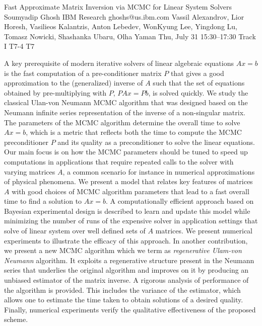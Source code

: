\begin{talk}
  {Fast Approximate Matrix Inversion via MCMC for Linear System Solvers}%
  {Soumyadip Ghosh}%
  {IBM Research}%
  {ghoshs@us.ibm.com}%
  {Vassil Alexandrov, Lior Horesh, Vasilieos Kalantzis, Anton Lebedev,  WonKyung Lee, Yingdong Lu, Tomasz Nowicki, Shashanka Ubaru, Olha Yaman}%
  {}%
  {Thu, July 31 15:30–17:30 Track I}%
  {T7-4}%
  {T7}%
			
A key prerequisite of modern iterative solvers of linear algebraic equations $Ax=b$ is the fast computation of a pre-conditioner matrix $P$ that gives a good approximation to the (generalized) inverse of $A$ such that the set of equations obtained by pre-multiplying with $P$, $PAx=Pb$, is solved quickly. 
We study the classical Ulan-von Neumann MCMC algorithm that was designed based on the Neumann infinite series representation of the inverse of a non-singular matrix. The parameters of the MCMC algorithm determine the overall time to solve $Ax=b$, which is a metric that 
reflects both the time to compute the MCMC preconditioner $P$ and its quality as a preconditioner to solve the linear equations. Our main focus is on how the MCMC parameters should be tuned to speed up computations in applications that require repeated calls to the solver with varying matrices $A$, a common scenario for instance in numerical approximations of physical phenomena. 
We present a model that relates key features of matrices $A$ with good choices of MCMC algorithm parameters that lead to a fast overall time to find a solution to $Ax=b$. A computationally efficient approach based on Bayesian experimental design is described to learn and update this model while minimizing the number of runs of the expensive solver in application settings that solve of linear system over well defined sets of $A$ matrices. We present numerical experiments to illustrate the efficacy of this approach.
In another contribution, we present a new MCMC algorithm which we term as \emph{regenerative Ulam-von Neumann} algorithm. It exploits a regenerative structure present in the Neumann series that underlies the original algorithm and improves on it by producing an unbiased estimator of the matrix inverse. A rigorous analysis of performance of the algorithm is provided. This includes the variance of the estimator, which allows one to estimate the time taken to obtain solutions of a desired quality. Finally, numerical experiments verify the qualitative effectiveness of the proposed scheme. 

\end{talk}
